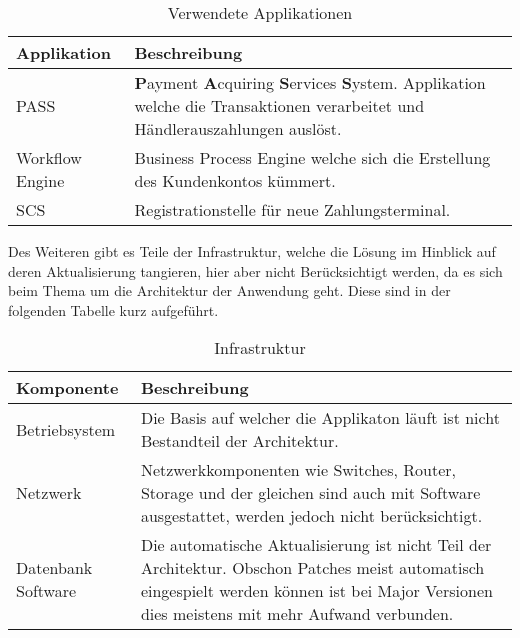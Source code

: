 \begin{table}[H]
	\centering
	\caption{Verwendete Applikationen}
	\begin{tabular}{ | p{3cm} | p{11cm} | }
		\toprule
		{\textbf{Applikation}} & {\textbf{Beschreibung}} \\
		\midrule
		PASS & \textbf{P}ayment \textbf{A}cquiring \textbf{S}ervices \textbf{S}ystem. Applikation welche die Transaktionen verarbeitet und Händlerauszahlungen auslöst. \\ \hline
		Workflow Engine & Business Process Engine welche sich die Erstellung des Kundenkontos kümmert.\\ \hline
		SCS & Registrationstelle für neue Zahlungsterminal.\\
		\bottomrule
	\end{tabular}
\end{table}

Des Weiteren gibt es Teile der Infrastruktur, welche die Lösung im Hinblick auf deren Aktualisierung tangieren, hier aber nicht Berücksichtigt werden, da es sich beim Thema um die Architektur der Anwendung geht. Diese sind in der folgenden Tabelle kurz aufgeführt.

\begin{table}[H]
	\centering
	\caption{Infrastruktur}
	\begin{tabular}{ | p{3cm} | p{11cm} | }
		\toprule
		{\textbf{Komponente}} & {\textbf{Beschreibung}} \\
		\midrule
		Betriebsystem & Die Basis auf welcher die Applikaton läuft ist nicht Bestandteil der Architektur. \\ \hline
		Netzwerk & Netzwerkkomponenten wie Switches, Router, Storage und der gleichen sind auch mit Software ausgestattet, werden jedoch nicht berücksichtigt.\\ \hline
		Datenbank Software & Die automatische Aktualisierung ist nicht Teil der Architektur. Obschon Patches meist automatisch eingespielt werden können ist bei Major Versionen dies meistens mit mehr Aufwand verbunden. \\
		\bottomrule
	\end{tabular}
\end{table}

